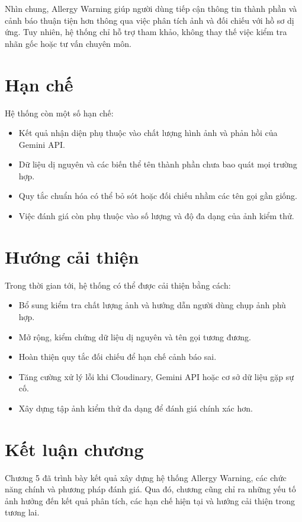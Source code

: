 Nhìn chung, Allergy Warning giúp người dùng tiếp cận thông tin thành
phần và cảnh báo thuận tiện hơn thông qua việc phân tích ảnh và đối
chiếu với hồ sơ dị ứng. Tuy nhiên, hệ thống chỉ hỗ trợ tham khảo,
không thay thế việc kiểm tra nhãn gốc hoặc tư vấn chuyên môn.

\section{Hạn chế}

Hệ thống còn một số hạn chế:

\begin{itemize}
	\item Kết quả nhận diện phụ thuộc vào chất lượng hình ảnh và phản hồi của Gemini API.
	\item Dữ liệu dị nguyên và các biến thể tên thành phần chưa bao quát mọi trường hợp.
	\item Quy tắc chuẩn hóa có thể bỏ sót hoặc đối chiếu nhầm các tên gọi gần giống.
	\item Việc đánh giá còn phụ thuộc vào số lượng và độ đa dạng của ảnh kiểm thử.
\end{itemize}

\section{Hướng cải thiện}

Trong thời gian tới, hệ thống có thể được cải thiện bằng cách:

\begin{itemize}
	\item Bổ sung kiểm tra chất lượng ảnh và hướng dẫn người dùng chụp ảnh phù hợp.
	\item Mở rộng, kiểm chứng dữ liệu dị nguyên và tên gọi tương đương.
	\item Hoàn thiện quy tắc đối chiếu để hạn chế cảnh báo sai.
	\item Tăng cường xử lý lỗi khi Cloudinary, Gemini API hoặc cơ sở dữ liệu gặp sự cố.
	\item Xây dựng tập ảnh kiểm thử đa dạng để đánh giá chính xác hơn.
\end{itemize}

\section{Kết luận chương}

Chương 5 đã trình bày kết quả xây dựng hệ thống Allergy Warning,
các chức năng chính và phương pháp đánh giá. Qua đó, chương cũng
chỉ ra những yếu tố ảnh hưởng đến kết quả phân tích, các hạn chế
hiện tại và hướng cải thiện trong tương lai.

